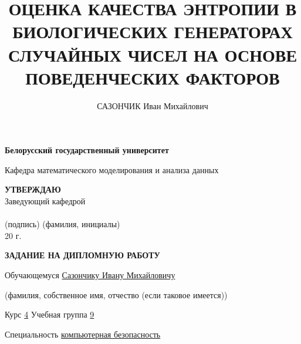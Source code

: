 \documentclass[14pt, a4paper]{extreport}
\title{ОЦЕНКА КАЧЕСТВА ЭНТРОПИИ В БИОЛОГИЧЕСКИХ ГЕНЕРАТОРАХ СЛУЧАЙНЫХ ЧИСЕЛ НА ОСНОВЕ ПОВЕДЕНЧЕСКИХ ФАКТОРОВ}
\author{САЗОНЧИК Иван Михайлович}
\begin{document}
\maketitle
\newpage
\thispagestyle{empty}
\begin{center}
\textbf{Белорусский государственный университет}
 
Кафедра математического моделирования и анализа данных
\end{center}
 
\vspace{1cm}
 
\begin{flushright}
\textbf{УТВЕРЖДАЮ}\\
Заведующий \underline{\hspace{3cm}} кафедрой\\[0.5cm]
\underline{\hspace{4cm}}\\
{\footnotesize (подпись) (фамилия, инициалы)}\\[0.3cm]
\underline{\hspace{1.5cm}} \underline{\hspace{3cm}} 20\underline{\hspace{0.5cm}} г.
\end{flushright}
 
\vspace{1.5cm}
 
\begin{center}
\textbf{ЗАДАНИЕ НА ДИПЛОМНУЮ РАБОТУ}
\end{center}
 
\vspace{1cm}
 
\noindent Обучающемуся \underline{Сазончику Ивану Михайловичу}\\
{\centering\footnotesize (фамилия, собственное имя, отчество (если таковое имеется))\par}
 
\noindent Курс \underline{\hspace{2.5cm}4\hspace{2.5cm}} \quad Учебная группа \underline{\hspace{2.5cm}9\hspace{2.5cm}}
 
\noindent Специальность \underline{\hspace{3cm}компьютерная безопасность\hspace{3cm}}
 
\vspace{0.8cm}
 
\end{document}
